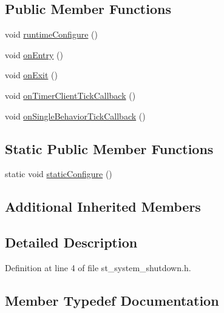 \subsection*{Public Member Functions}
\begin{DoxyCompactItemize}
\item 
void \hyperlink{structsm__respira__1_1_1StSystemShutdown_a0e64b317e2720facbfeabc99956bf071}{runtime\+Configure} ()
\item 
void \hyperlink{structsm__respira__1_1_1StSystemShutdown_a1a1c466be4f427b79e0276ab7f38344a}{on\+Entry} ()
\item 
void \hyperlink{structsm__respira__1_1_1StSystemShutdown_adc045e262e894feb5f040f9d3e98764a}{on\+Exit} ()
\item 
void \hyperlink{structsm__respira__1_1_1StSystemShutdown_a4c113d1875fb5a538c45973b87900ff6}{on\+Timer\+Client\+Tick\+Callback} ()
\item 
void \hyperlink{structsm__respira__1_1_1StSystemShutdown_af0466e4c8c2527eeb76888d8dfec396c}{on\+Single\+Behavior\+Tick\+Callback} ()
\end{DoxyCompactItemize}
\subsection*{Static Public Member Functions}
\begin{DoxyCompactItemize}
\item 
static void \hyperlink{structsm__respira__1_1_1StSystemShutdown_a3e55c52ddc658248bf37a7c7dc353a44}{static\+Configure} ()
\end{DoxyCompactItemize}
\subsection*{Additional Inherited Members}


\subsection{Detailed Description}


Definition at line 4 of file st\+\_\+system\+\_\+shutdown.\+h.



\subsection{Member Typedef Documentation}
